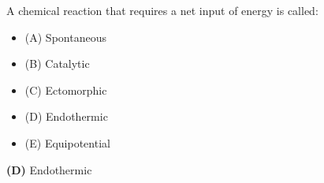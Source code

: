 

A chemical reaction that requires a net input of energy is called:

\begin{itemize}
\item{(A)} Spontaneous
\vskip 5pt 
\item{(B)} Catalytic
\vskip 5pt 
\item{(C)} Ectomorphic
\vskip 5pt 
\item{(D)} Endothermic
\vskip 5pt 
\item{(E)} Equipotential
\end{itemize}







{\bf (D)} Endothermic
 










